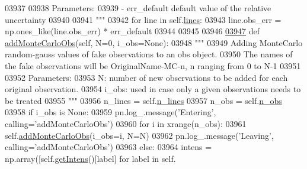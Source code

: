 \begin{DoxyCode}
{{{{{{{{{{{{{{{{{{{{{{03937 \textcolor{stringliteral}{        }
03938 \textcolor{stringliteral}{        Parameters:}
03939 \textcolor{stringliteral}{            - err\_default     default value of the relative uncertainty}
03940 \textcolor{stringliteral}{        }
03941 \textcolor{stringliteral}{        """}
03942         \textcolor{keywordflow}{for} line \textcolor{keywordflow}{in} self.\hyperlink{classpyneb_1_1core_1_1pynebcore_1_1_observation_a78332043ca9f290590edf6b8a1e5b767}{lines}:
03943             line.obs\_err = np.ones\_like(line.obs\_err) * err\_default
03944 
03945     
03946     
\hypertarget{pynebcore_8py_source_l03947}{}\hyperlink{classpyneb_1_1core_1_1pynebcore_1_1_observation_a8005a1ad8167e96e117d4b81d6e919ff}{03947}     \textcolor{keyword}{def }\hyperlink{classpyneb_1_1core_1_1pynebcore_1_1_observation_a8005a1ad8167e96e117d4b81d6e919ff}{addMonteCarloObs}(self, N=0, i\_obs=None):
03948         \textcolor{stringliteral}{"""}
03949 \textcolor{stringliteral}{        Adding MonteCarlo random-gauss values of fake observations to an obs object.}
03950 \textcolor{stringliteral}{        The names of the fake observations will be OriginalName-MC-n, n ranging from 0 to N-1}
03951 \textcolor{stringliteral}{        }
03952 \textcolor{stringliteral}{        Parameters:}
03953 \textcolor{stringliteral}{        N: number of new observations to be added for each original observation.}
03954 \textcolor{stringliteral}{        i\_obs: used in case only a given observations needs to be treated}
03955 \textcolor{stringliteral}{        """}
03956         n\_lines = self.\hyperlink{classpyneb_1_1core_1_1pynebcore_1_1_observation_ac61184d33006ae92f2a3ed42adc149be}{n\_lines}
03957         n\_obs = self.\hyperlink{classpyneb_1_1core_1_1pynebcore_1_1_observation_aef2877f7f50f5c70cee1f0da97b34081}{n\_obs}
03958         \textcolor{keywordflow}{if} i\_obs \textcolor{keywordflow}{is} \textcolor{keywordtype}{None}:
03959             pn.log\_.message(\textcolor{stringliteral}{'Entering'}, calling=\textcolor{stringliteral}{'addMonteCarloObs'})
03960             \textcolor{keywordflow}{for} i \textcolor{keywordflow}{in} xrange(n\_obs):
03961                 self.\hyperlink{classpyneb_1_1core_1_1pynebcore_1_1_observation_a8005a1ad8167e96e117d4b81d6e919ff}{addMonteCarloObs}(i\_obs=i, N=N)
03962             pn.log\_.message(\textcolor{stringliteral}{'Leaving'}, calling=\textcolor{stringliteral}{'addMonteCarloObs'})
03963         \textcolor{keywordflow}{else}:
03964             intens = np.array([self.\hyperlink{classpyneb_1_1core_1_1pynebcore_1_1_observation_ac380b22660411926b90f935f5123494b}{getIntens}()[label] \textcolor{keywordflow}{for} label \textcolor{keywordflow}{in} self.
}}}}}}}}}}}}}}}}}}}}}}
\end{DoxyCode}
